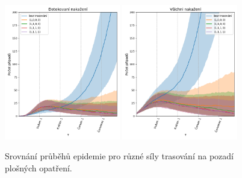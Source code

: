 \begin{figure}[h!]
  \centering
  \includegraphics[width=0.45\textwidth]{pic/history_second_expB_detected_iqr.png}
  \includegraphics[width=0.45\textwidth]{pic/history_second_expB_all_iqr.png}
  \caption{Srovnání průběhů epidemie pro různé síly trasování na pozadí plošných opatření.}
  \label{pg:fig:exp1b}
\end{figure}

